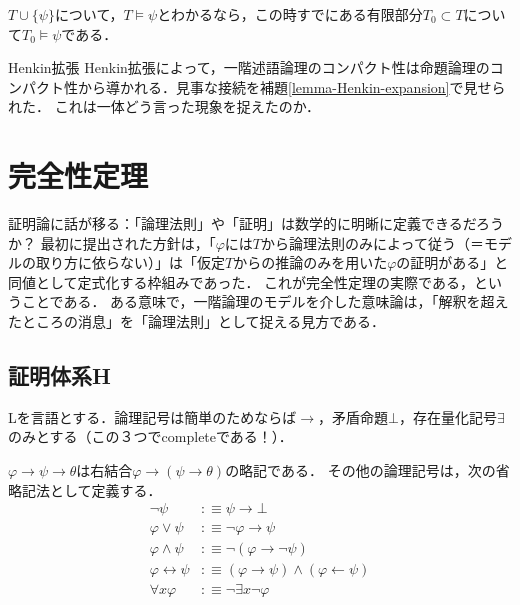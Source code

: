 \documentclass[uplatex, 12pt, dvipdfmx]{jsreport}
\begin{document}
\begin{corollary}
    $T\cup\{\psi\}$について，$T\vDash\psi$とわかるなら，この時すでにある有限部分$T_0\subset T$について$T_0\vDash\psi$である．
\end{corollary}

\begin{itembox}[l]{Henkin拡張}
    Henkin拡張によって，一階述語論理のコンパクト性は命題論理のコンパクト性から導かれる．見事な接続を補題\ref{lemma-Henkin-expansion}で見せられた．
    これは一体どう言った現象を捉えたのか．
\end{itembox}

\section{完全性定理}

証明論に話が移る：「論理法則」や「証明」は数学的に明晰に定義できるだろうか？
最初に提出された方針は，「$\varphi$には$T$から論理法則のみによって従う（＝モデルの取り方に依らない）」は「仮定$T$からの推論のみを用いた$\varphi$の証明がある」と同値として定式化する枠組みであった．
これが完全性定理の実際である，ということである．
ある意味で，一階論理のモデルを介した意味論は，「解釈を超えたところの消息」を「論理法則」として捉える見方である．

\subsection{証明体系H}

\begin{notation}
    Lを言語とする．論理記号は簡単のためならば$\to$，矛盾命題$\bot$，存在量化記号$\exists$のみとする（この３つでcompleteである！）．

    $\varphi\to\psi\to\theta$は右結合$\varphi\to(\psi\to\theta)$の略記である．
    その他の論理記号は，次の省略記法として定義する．
    \begin{align*}
        \lnot\psi &:\equiv \psi\to\bot\\
        \varphi\lor\psi &:\equiv \lnot\varphi\to\psi\\
        \varphi\land\psi &:\equiv \lnot(\varphi\to\lnot\psi)\\
        \varphi\leftrightarrow\psi &:\equiv (\varphi\rightarrow\psi)\land(\varphi\leftarrow\psi)\\
        \forall x\varphi &:\equiv \lnot\exists x\lnot\varphi
    \end{align*}
\end{notation}
\end{document}
